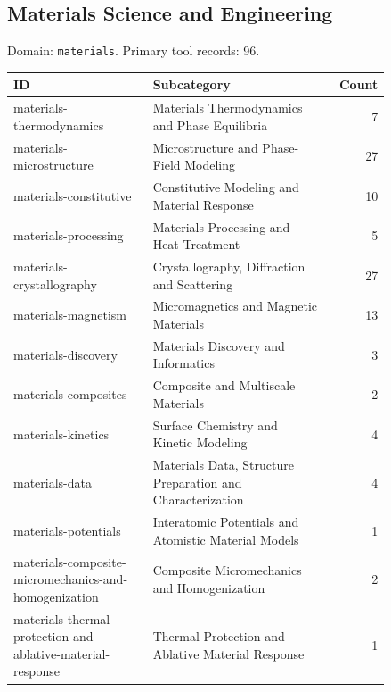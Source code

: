 \subsection{Materials Science and Engineering}
\noindent Domain: \texttt{materials}. Primary tool records: 96.
\begin{longtable}{p{0.37\linewidth}p{0.47\linewidth}r}
ID & Subcategory & Count\\\hline\endhead
materials-thermodynamics & Materials Thermodynamics and Phase Equilibria & 7\\
materials-microstructure & Microstructure and Phase-Field Modeling & 27\\
materials-constitutive & Constitutive Modeling and Material Response & 10\\
materials-processing & Materials Processing and Heat Treatment & 5\\
materials-crystallography & Crystallography, Diffraction and Scattering & 27\\
materials-magnetism & Micromagnetics and Magnetic Materials & 13\\
materials-discovery & Materials Discovery and Informatics & 3\\
materials-composites & Composite and Multiscale Materials & 2\\
materials-kinetics & Surface Chemistry and Kinetic Modeling & 4\\
materials-data & Materials Data, Structure Preparation and Characterization & 4\\
materials-potentials & Interatomic Potentials and Atomistic Material Models & 1\\
materials-composite-micromechanics-and-homogenization & Composite Micromechanics and Homogenization & 2\\
materials-thermal-protection-and-ablative-material-response & Thermal Protection and Ablative Material Response & 1\\
\end{longtable}
